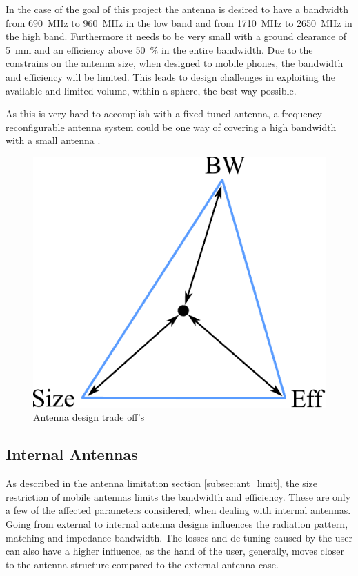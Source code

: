 In the case of the goal of this project the antenna is desired to have a bandwidth from \SI{690}{MHz} to \SI{960}{MHz} in the low band and from \SI{1710}{MHz} to \SI{2650}{MHz} in the high band. Furthermore it needs to be very small with a ground clearance of \SI{5}{mm} and an efficiency above \SI{50}{\percent} in the entire bandwidth. Due to the constrains on the antenna size, when designed to mobile phones, the bandwidth and efficiency will be limited. This leads to design challenges in exploiting the available and limited volume, within a sphere, the best way possible\cite{balanis2012antenna}.  

As this is very hard to accomplish with a fixed-tuned antenna, a frequency reconfigurable antenna system could be one way of covering a high bandwidth with a small antenna \cite{hilbert2015tradeoff}.  

\begin{figure}[htbp]
  \centering
  \includegraphics[scale=0.4]{img/analysis/antenna_limitations}
  \caption{Antenna design trade off's}
  \label{fig:antenna_tradeoff}
\end{figure}

\subsection{Internal Antennas}
As described in the antenna limitation section \ref{subsec:ant_limit}, the size restriction of mobile antennas limits the bandwidth and efficiency.
These are only a few of the affected parameters considered, when dealing with internal antennas. Going from external to internal antenna designs influences the radiation pattern, matching and impedance bandwidth. The losses and de-tuning caused by the user can also have a higher influence, as the hand of the user, generally, moves closer to the antenna structure compared to the external antenna case\cite{fujimoto2008mobile}. 

